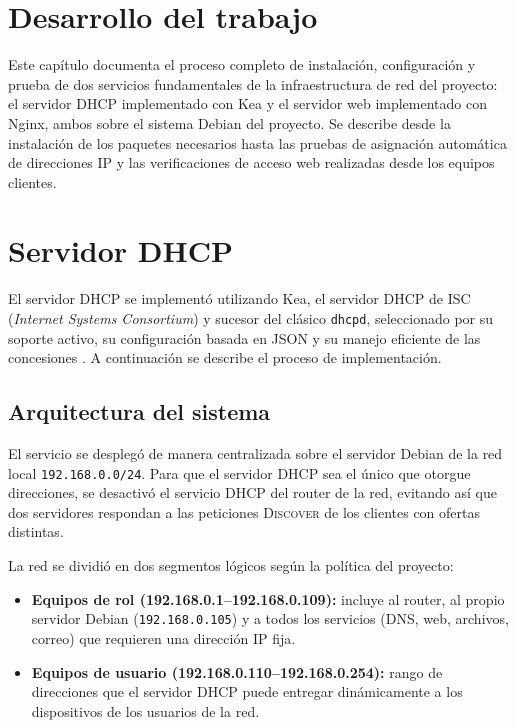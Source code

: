 
\section{Desarrollo del trabajo}

Este capítulo documenta el proceso completo de instalación, configuración y
prueba de dos servicios fundamentales de la infraestructura de red del
proyecto: el servidor DHCP implementado con Kea y el servidor web
implementado con Nginx, ambos sobre el sistema Debian del proyecto. Se
describe desde la instalación de los paquetes necesarios hasta las pruebas
de asignación automática de direcciones IP y las verificaciones de acceso
web realizadas desde los equipos clientes.

\section{Servidor DHCP}

El servidor DHCP se implementó utilizando Kea, el servidor DHCP de ISC
(\textit{Internet Systems Consortium}) y sucesor del clásico
\texttt{dhcpd}, seleccionado por su soporte activo, su configuración basada
en JSON y su manejo eficiente de las concesiones \cite{keaDocs}. A
continuación se describe el proceso de implementación.

\subsection{Arquitectura del sistema}

El servicio se desplegó de manera centralizada sobre el servidor Debian de la
red local \texttt{192.168.0.0/24}. Para que el servidor DHCP sea el único que
otorgue direcciones, se desactivó el servicio DHCP del router de la red,
evitando así que dos servidores respondan a las peticiones \textsc{Discover}
de los clientes con ofertas distintas.

La red se dividió en dos segmentos lógicos según la política del proyecto:

\begin{itemize}
  \item \textbf{Equipos de rol (192.168.0.1--192.168.0.109):} incluye al
        router, al propio servidor Debian (\texttt{192.168.0.105}) y a todos
        los servicios (DNS, web, archivos, correo) que requieren una dirección
        IP fija.
  \item \textbf{Equipos de usuario (192.168.0.110--192.168.0.254):} rango de
        direcciones que el servidor DHCP puede entregar dinámicamente a los
        dispositivos de los usuarios de la red.
\end{itemize}


